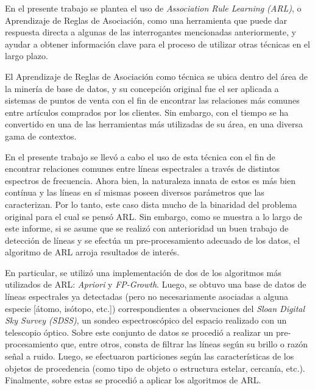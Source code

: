 \begin{intro}
En el presente trabajo se plantea el uso de \textit{Association Rule Learning (ARL)}, o Aprendizaje de Reglas de Asociación, como una herramienta que puede dar respuesta directa a algunas de las interrogantes mencionadas anteriormente, y ayudar a obtener información clave para el proceso de utilizar otras técnicas en el largo plazo.

El Aprendizaje de Reglas de Asociación como técnica se ubica dentro del área de la minería de base de datos, y su concepción original fue el ser aplicada a sistemas de puntos de venta con el fin de encontrar las relaciones más comunes entre artículos comprados por los clientes. Sin embargo, con el tiempo se ha convertido en una de las herramientas más utilizadas de su área, en una diversa gama de contextos.

En el presente trabajo se llevó a cabo el uso de esta técnica con el fin de encontrar relaciones comunes entre líneas espectrales a través de distintos espectros de frecuencia. Ahora bien, la naturaleza innata de estos es más bien contínua y las líneas en sí mismas poseen diversos parámetros que las caracterizan. Por lo tanto, este caso dista mucho de la binaridad del problema original para el cual se pensó ARL. Sin embargo, como se muestra a lo largo de este informe, si se asume que se realizó con anterioridad un buen trabajo de detección de líneas y se efectúa un pre-procesamiento adecuado de los datos, el algoritmo de ARL arroja resultados de interés.

En particular, se utilizó una implementación de dos de los algoritmos más utilizados de ARL: \textit{Apriori} y \textit{FP-Growth}. Luego, se obtuvo una base de datos de líneas espectrales ya detectadas (pero no necesariamente asociadas a alguna especie [átomo, isótopo, etc.]) correspondientes a observaciones del \textit{Sloan Digital Sky Survey (SDSS)}, un sondeo espectroscópico del espacio realizado con un telescopio óptico. Sobre este conjunto de datos se procedió a realizar un pre-procesamiento que, entre otros, consta de filtrar las líneas según su brillo o razón señal a ruido. Luego, se efectuaron particiones según las características de los objetos de procedencia (como tipo de objeto o estructura estelar, cercanía, etc.). Finalmente, sobre estas se procedió a aplicar los algoritmos de ARL.


\end{intro}
